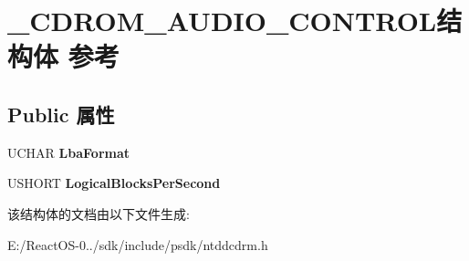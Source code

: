 \hypertarget{struct___c_d_r_o_m___a_u_d_i_o___c_o_n_t_r_o_l}{}\section{\+\_\+\+C\+D\+R\+O\+M\+\_\+\+A\+U\+D\+I\+O\+\_\+\+C\+O\+N\+T\+R\+O\+L结构体 参考}
\label{struct___c_d_r_o_m___a_u_d_i_o___c_o_n_t_r_o_l}
\subsection*{Public 属性}
\begin{DoxyCompactItemize}
\item 
\mbox{\label{struct___c_d_r_o_m___a_u_d_i_o___c_o_n_t_r_o_l_a066ed14f415d3130df97d7b31f0a995b}} 
U\+C\+H\+AR {\bfseries Lba\+Format}
\item 
\mbox{\label{struct___c_d_r_o_m___a_u_d_i_o___c_o_n_t_r_o_l_ac72ebdeb865421b2d0947160c95ec35c}} 
U\+S\+H\+O\+RT {\bfseries Logical\+Blocks\+Per\+Second}
\end{DoxyCompactItemize}


该结构体的文档由以下文件生成\+:\begin{DoxyCompactItemize}
\item 
E\+:/\+React\+O\+S-\/0../sdk/include/psdk/ntddcdrm.\+h\end{DoxyCompactItemize}
